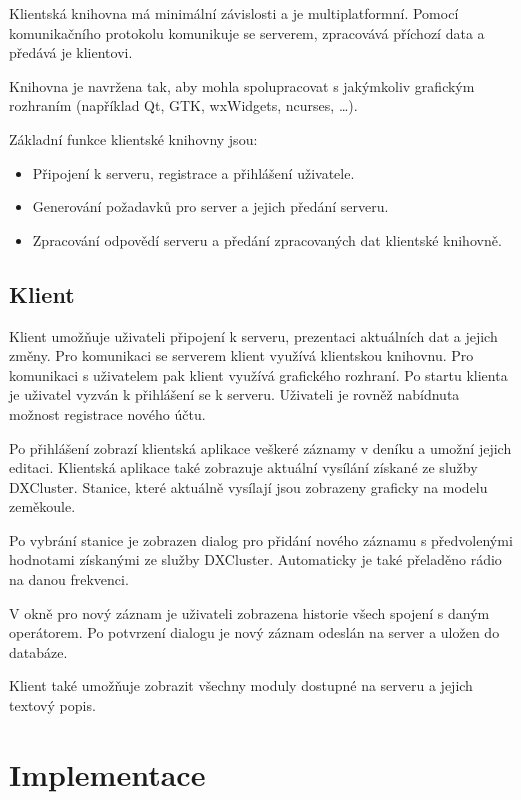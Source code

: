 Klientská knihovna má minimální závislosti a je multiplatformní. Pomocí komunikačního protokolu
komunikuje se serverem, zpracovává příchozí data a předává je klientovi.

Knihovna je navržena tak, aby mohla spolupracovat s jakýmkoliv grafickým
rozhraním (například Qt, GTK, wxWidgets, ncurses, \dots). %

Základní funkce klientské knihovny jsou:

\begin{itemize}
\item Připojení k serveru, registrace a přihlášení uživatele.
\item Generování požadavků pro server a jejich předání serveru.
\item Zpracování odpovědí serveru a předání zpracovaných dat klientské knihovně.
\end{itemize}

\section{Klient}
\label{navrh_klient}

Klient umožňuje uživateli připojení k serveru, prezentaci aktuálních dat a
jejich změny. Pro komunikaci
se serverem klient využívá klientskou knihovnu. Pro komunikaci s uživatelem pak klient využívá grafického rozhraní.
Po startu klienta je uživatel vyzván k přihlášení se k serveru. Uživateli je rovněž nabídnuta možnost registrace
nového účtu.

Po přihlášení zobrazí klientská aplikace veškeré záznamy v deníku a umožní jejich editaci. Klientská aplikace také zobrazuje
aktuální vysílání získané ze služby DXCluster. Stanice, které aktuálně vysílají jsou zobrazeny graficky na modelu 
zeměkoule.

Po vybrání stanice je zobrazen dialog pro přidání nového záznamu s předvolenými hodnotami získanými ze služby DXCluster. Automaticky
je také přeladěno rádio na danou frekvenci.

V okně pro nový záznam je uživateli zobrazena historie všech spojení s daným operátorem.
Po potvrzení dialogu je nový záznam odeslán na server a uložen do databáze.

Klient také umožňuje zobrazit všechny moduly dostupné na serveru a jejich
textový popis.


\chapter{Implementace}
\label{implementace}

